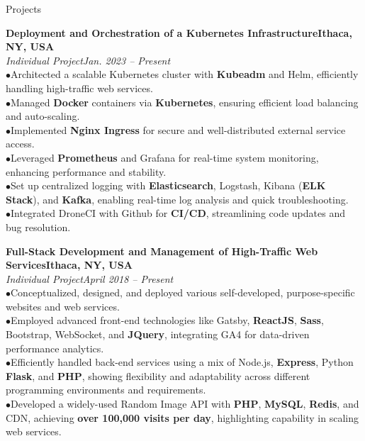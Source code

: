 \documentclass{resume} %
\begin{document}
\begin{rSection}{Projects}


{\bf Deployment and Orchestration of a Kubernetes Infrastructure}\hfill{\textbf{Ithaca, NY, USA}}
\\{\em Individual Project}\hfill {\em Jan. 2023 -- Present}
\\ $ \bullet $Architected a scalable Kubernetes cluster with \textbf{Kubeadm} and Helm, efficiently handling high-traffic web services.
\\ $ \bullet $Managed \textbf{Docker} containers via \textbf{Kubernetes}, ensuring efficient load balancing and auto-scaling.
\\ $ \bullet $Implemented \textbf{Nginx Ingress} for secure and well-distributed external service access.
\\ $ \bullet $Leveraged \textbf{Prometheus} and Grafana for real-time system monitoring, enhancing performance and stability.
\\ $ \bullet $Set up centralized logging with \textbf{Elasticsearch}, Logstash, Kibana (\textbf{ELK Stack}), and \textbf{Kafka}, enabling real-time log analysis and quick troubleshooting.
\\ $ \bullet $Integrated DroneCI with Github for \textbf{CI/CD}, streamlining code updates and bug resolution.



{\bf Full-Stack Development and Management of High-Traffic Web Services}\hfill{\textbf{Ithaca, NY, USA}}
\\{\em Individual Project}\hfill {\em April 2018 -- Present}
\\ $ \bullet $Conceptualized, designed, and deployed various self-developed, purpose-specific websites and web services.
\\ $ \bullet $Employed advanced front-end technologies like Gatsby, \textbf{ReactJS}, \textbf{Sass}, Bootstrap, WebSocket, and \textbf{JQuery}, integrating GA4 for data-driven performance analytics.
\\ $ \bullet $Efficiently handled back-end services using a mix of Node.js, \textbf{Express}, Python \textbf{Flask}, and \textbf{PHP}, showing flexibility and adaptability across different programming environments and requirements.
\\ $ \bullet $Developed a widely-used Random Image API with \textbf{PHP}, \textbf{MySQL}, \textbf{Redis}, and CDN, achieving \textbf{over 100,000 visits per day}, highlighting capability in scaling web services.


\end{rSection}
\end{document}
